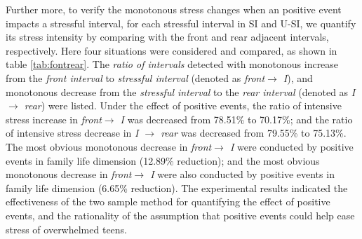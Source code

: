 Further more,
to verify the monotonous stress changes when an positive event impacts a stressful interval,
for each stressful interval in SI and U-SI,
we quantify its stress intensity by comparing with the front and rear adjacent intervals, respectively.
Here four situations were considered and compared,
as shown in table \ref{tab:fontrear}. 
The \emph{ratio of intervals} detected with monotonous increase from the \emph{front interval} to \emph{stressful interval} (denoted as \emph{front$ \rightarrow$ I}),
and monotonous decrease from the \emph{stressful interval} to the \emph{rear interval} (denoted as \emph{I $\rightarrow$ rear}) were listed.
Under the effect of positive events,
the ratio of intensive stress increase in \emph{front$ \rightarrow$ I} was decreased from 78.51\% to 70.17\%;
and the ratio of intensive stress decrease in \emph{I $\rightarrow$ rear} was decreased from 79.55\% to 75.13\%.
The most obvious monotonous decrease in \emph{front$ \rightarrow$ I} were conducted by positive events in family life dimension (12.89\% reduction);
and the most obvious monotonous decrease in \emph{front$ \rightarrow$ I} were also conducted by positive events in family life dimension (6.65\% reduction).
The experimental results indicated the effectiveness of the two sample method for quantifying the effect of positive events,
and the rationality of the assumption that positive events could help ease stress of overwhelmed teens.




